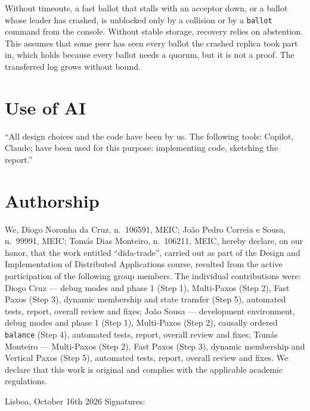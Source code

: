 \documentclass[times, 10pt,twocolumn]{article}
\begin{document}

Without timeouts, a fast ballot that stalls with an acceptor down, or a ballot
whose leader has crashed, is unblocked only by a collision or by a
\texttt{ballot} command from the console. Without stable storage, recovery
relies on abstention. This assumes that some peer has seen every ballot the
crashed replica took part in, which holds because every ballot needs a quorum,
but it is not a proof. The transferred log grows without bound.

\section*{Use of AI}

``All design choices and the code have been by us. The following tools:
Copilot, Claude; have been used for this purpose: implementing code,
sketching the report.''

\section*{Authorship}

{\small
We, Diogo Noronha da Cruz, n.\textordmasculine~106591, MEIC; Jo\~ao Pedro
Correia e Sousa, n.\textordmasculine~99991, MEIC; Tom\'as Dias Monteiro,
n.\textordmasculine~106211, MEIC, hereby declare, on our honor, that the
work entitled ``dida-trade'', carried out as part of the Design and
Implementation of Distributed Applications course, resulted from the active
participation of the following group members. The individual contributions
were:
Diogo Cruz --- debug modes and phase 1 (Step 1), Multi-Paxos (Step 2), Fast
Paxos (Step 3), dynamic membership and state transfer (Step 5), automated
tests, report, overall review and fixes;
Jo\~ao Sousa --- development environment, debug modes and phase 1 (Step 1),
Multi-Paxos (Step 2), causally ordered \texttt{balance} (Step 4), automated
tests, report, overall review and fixes;
Tom\'as Monteiro --- Multi-Paxos (Step 2), Fast Paxos (Step 3), dynamic
membership and Vertical Paxos (Step 5), automated tests, report, overall review
and fixes.
We declare that this work is original and complies with the applicable
academic regulations.

Lisboa, October 16th 2026 \hfill Signatures:
}
\end{document}

